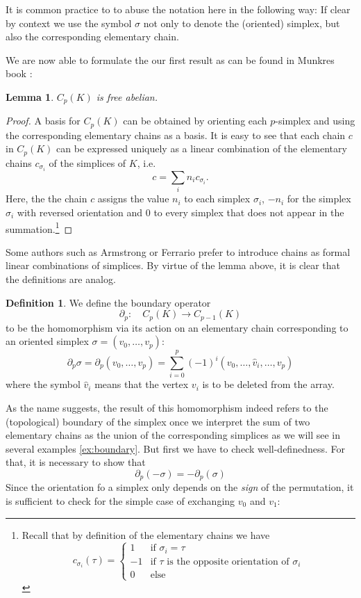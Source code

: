 \documentclass[toc=bib]{scrartcl}
\theoremstyle{plain}
\newtheorem{lemma}[theorem]{Lemma}
\theoremstyle{definition}
\newtheorem	{definition}[theorem]{Definition}
\theoremstyle{remark}
\begin{document}
It is common practice to to abuse the notation here in the following way: If clear by context we use the symbol $\sigma$ not only to denote the (oriented) simplex, but also the corresponding elementary chain.

We are now able to formulate the our first result as can be found in Munkres book \cite[Lemma 5.1, p. 28]{mu}:
\begin{lemma}
	$C_p(K)$ is free abelian. 
\end{lemma}

\begin{proof}
	A basis for $C_p(K)$ can be obtained by orienting each $p$-simplex and using the corresponding elementary chains as a basis.
	It is easy to see that each chain $c$ in $C_p(K)$ can be expressed uniquely as a linear combination of the elementary chains $c_{\sigma_i}$ of the simplices of $K$, i.e.
	\[
	c=\sum_{i}n_i c_{\sigma_i}.
	\]
	Here, the the chain $c$ assigns the value $n_i$ to each simplex $\sigma_i$, $-n_i$ for the simplex $\sigma_i$ with reversed orientation and $0$ to every simplex that does not appear in the summation.\footnote{Recall that by definition of the elementary chains we have \[c_{\sigma_i}(\tau)=\begin{cases}
		1 &\text{if }\sigma_i=\tau\\
		-1&\text{if }\tau \text{ is the opposite orientation of }\sigma_i\\
		0&\text{else}
		\end{cases}
		\]}
\end{proof}

Some authors such as Armstrong \parencite[p.176f]{ar} or Ferrario \parencite[p.60]{fe} prefer to introduce chains as formal linear combinations of simplices. By virtue of the lemma above, it is clear that the definitions are analog.

\begin{definition}
	We define the boundary operator 
	\[
	\partial_p:\quad C_p(K)\to C_{p-1}(K)
	\]
	to be the homomorphism via its action on an elementary chain corresponding to an oriented simplex $\sigma=(v_0,\dots,v_p)$:
	\[
	\partial_p\sigma=\partial_p(v_0,\dots,v_p)=\sum_{i=0}^{p}(-1)^i(v_0,\dots,\hat{v}_i,\dots,v_p)
	\]
	where the symbol $\hat{v}_i$ means that the vertex $v_i$ is to be deleted from the array.
\end{definition}

As the name suggests, the result of this homomorphism indeed refers to the (topological) boundary of the simplex once we interpret the sum of two elementary chains as the union of the corresponding simplices as we will see in several examples \ref{ex:boundary}. But first we have to check well-definedness. For that, it is necessary to show that
\[\partial_p(-\sigma)=-\partial_p(\sigma) 
\]
Since the orientation fo a simplex only depends on the \emph{sign} of the permutation, it is sufficient to check for the simple case of exchanging $v_0$ and $v_1$:
\end{document}
